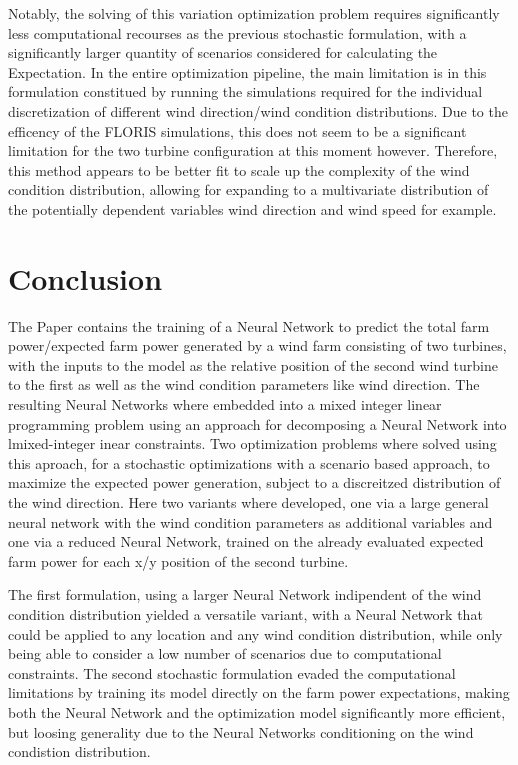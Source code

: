 \documentclass[preprint,12pt]{elsarticle}
\begin{document}
Notably, the solving of this variation optimization problem requires significantly less computational recourses as the previous stochastic formulation, with a significantly larger quantity of scenarios considered for calculating the Expectation. In the entire optimization pipeline, the main limitation is in this formulation constitued by running the simulations required for the individual discretization of different wind direction/wind condition distributions. Due to the efficency of the FLORIS simulations, this does not seem to be a significant limitation for the two turbine configuration at this moment however. Therefore, this method appears to be better fit to scale up the complexity of the wind condition distribution, allowing for expanding to a multivariate distribution of the potentially dependent variables wind direction and wind speed for example. 



\section{Conclusion}\label{chapter:conclusion}

The Paper contains the training of a Neural Network to predict the total farm power/expected farm power generated by a wind farm consisting of two turbines, with the inputs to the model as the relative position of the second wind turbine to the first as well as the wind condition parameters like wind direction. The resulting Neural Networks where embedded into a mixed integer linear programming problem using an approach for decomposing a Neural Network into lmixed-integer inear constraints. Two optimization problems where solved using this aproach, for a stochastic optimizations with a scenario based approach, to maximize the expected power generation, subject to a discreitzed distribution of the wind direction. Here two variants where developed, one via a large general neural network with the wind condition parameters as additional variables and one via a reduced Neural Network, trained on the already evaluated expected farm power for each x/y position of the second turbine. 

The first formulation, using a larger Neural Network indipendent of the wind condition distribution yielded a versatile variant, with a Neural Network that could be applied to any location and any wind condition distribution, while only being able to consider a low number of scenarios due to computational constraints. The second stochastic formulation evaded the computational limitations by training its model directly on the farm power expectations, making both the Neural Network and the optimization model significantly more efficient, but loosing generality due to the Neural Networks conditioning on the wind condistion distribution.
\end{document}
